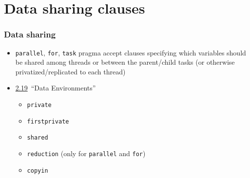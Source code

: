 \documentclass[12pt,dvipdfmx]{beamer}
\newcommand{\sectionompdataenv}{{\href{https://www.openmp.org/spec-html/5.0/openmpse27.html\#x135-5430002.19}{2.19}}}
\newcommand{\ao}[1]{{\color{blue}#1}}
\begin{document}

\section{Data sharing clauses}

\begin{frame}
\frametitle{Data sharing}
\begin{itemize}
\item {\tt parallel}, {\tt for}, {\tt task} pragma accept
  clauses specifying which variables should be shared among threads
  or between the parent/child tasks
  (or otherwise privatized/replicated to each thread)
\item \sectionompdataenv\ ``Data Environments''
  \begin{itemize}
  \item \ao{\tt private}
  \item {\tt firstprivate}
  \item \ao{\tt shared}
  \item \ao{\tt reduction} (only for {\tt parallel} and {\tt for})
  \item {\tt copyin}
  \end{itemize}
\end{itemize}
\end{frame}
\end{document}
